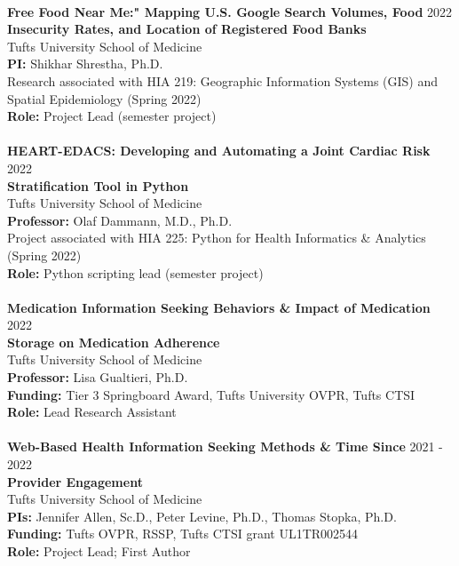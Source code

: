 \documentclass[a4paper,12pt]{article}
\begin{document}
{\\
\textbf{Free Food Near Me:" Mapping U.S. Google Search Volumes, Food} \hfill 2022 \\ \textbf{Insecurity Rates, and Location of Registered Food Banks} \\
Tufts University School of Medicine\\
\textbf{PI:} Shikhar Shrestha, Ph.D.\\
Research associated with HIA 219: Geographic Information Systems (GIS) and \\Spatial Epidemiology (Spring 2022)\\
\textbf{Role:} Project Lead (semester project)\\
\\
\textbf{HEART-EDACS: Developing and Automating a Joint Cardiac Risk} \hfill 2022 \\ \textbf{Stratification Tool in Python} \\
Tufts University School of Medicine\\
\textbf{Professor:} Olaf Dammann, M.D., Ph.D.\\
Project associated with HIA 225: Python for Health Informatics \& Analytics (Spring 2022)\\
\textbf{Role:} Python scripting lead (semester project)\\
\\
\textbf{Medication Information Seeking Behaviors \& Impact of Medication} \hfill 2022 \\ \textbf{Storage on Medication Adherence} \\
Tufts University School of Medicine\\
\textbf{Professor:} Lisa Gualtieri, Ph.D.\\
\textbf{Funding:}  Tier 3 Springboard Award, Tufts University OVPR, Tufts CTSI\\
\textbf{Role:} Lead Research Assistant\\
\\
\textbf{Web-Based Health Information Seeking Methods \& Time Since} \hfill 2021 - 2022 \\ \textbf{Provider Engagement} \\
Tufts University School of Medicine\\
\textbf{PIs:}  Jennifer Allen, Sc.D., Peter Levine, Ph.D., Thomas Stopka, Ph.D.\\
\textbf{Funding:}  Tufts OVPR, RSSP, Tufts CTSI grant UL1TR002544\\
\textbf{Role:} Project Lead; First Author\\
}
\end{document}
